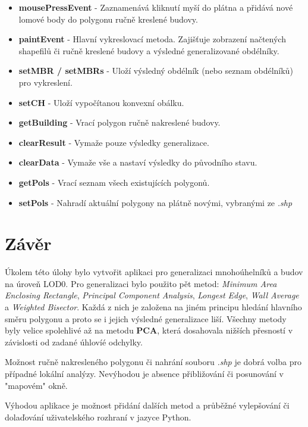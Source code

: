 \documentclass[12pt, a4paper]{article}
\begin{document}
\begin{itemize}
  \item \textbf{mousePressEvent} - Zaznamenává kliknutí myší do plátna a přidává nové lomové body do polygonu ručně kreslené budovy.
  \item \textbf{paintEvent} - Hlavní vykreslovací metoda. Zajišťuje zobrazení načtených shapefilů či ručně kreslené budovy a výsledné generalizované obdélníky.
  \item \textbf{setMBR / setMBRs} - Uloží výsledný obdélník (nebo seznam obdélníků) pro vykreslení.
  \item \textbf{setCH} - Uloží vypočítanou konvexní obálku.
  \item \textbf{getBuilding} - Vrací polygon ručně nakreslené budovy.
  \item \textbf{clearResult} - Vymaže pouze výsledky generalizace.
  \item \textbf{clearData} - Vymaže vše a nastaví výsledky do původního stavu.
  \item \textbf{getPols} - Vrací seznam všech existujících polygonů.
  \item \textbf{setPols} - Nahradí aktuální polygony na plátně novými, vybranými ze \textit{.shp}
\end{itemize}

\section{Závěr}
Úkolem této úlohy bylo vytvořit aplikaci pro generalizaci mnohoúhelníků a budov na úroveň LOD0. Pro generalizaci bylo použito pět metod: \textit{Minimum Area Enclosing Rectangle}, \textit{Principal Component Analysis}, \textit{Longest Edge}, \textit{Wall Average} a \textit{Weighted Bisector}. Každá z nich je založena na jiném principu hledání hlavního směru polygonu a proto se i jejich výsledné generalizace liší. Všechny metody byly velice spolehlivé až na metodu \textbf{PCA}, která dosahovala nižších přesností v závislosti od zadané úhlovíé odchylky.

Možnost ručně nakresleného polygonu či nahrání souboru \textit{.shp} je dobrá volba pro případné lokální analýzy. Nevýhodou je absence přibližování či posunování v "mapovém" okně.

Výhodou aplikace je možnost přidání dalších metod a průběžné vylepšování či dolaďování uživatelského rozhraní v jazyce Python.

\printbibliography[title=Zdroje]
\end{document}
